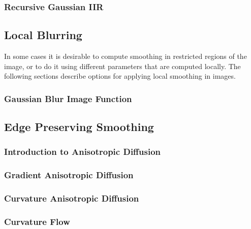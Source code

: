 \subsubsection{Recursive Gaussian IIR}
\label{sec:RecursiveGaussianImageFilter}



\subsection{Local Blurring}
\label{sec:BlurringFunctions}

In some cases it is desirable to compute smoothing in restricted regions of the
image, or to do it using different parameters that are computed locally.  The
following sections describe options for applying local smoothing in images.

\subsubsection{Gaussian Blur Image Function}
\label{sec:GaussianBlurImageFunction}



\subsection{Edge Preserving Smoothing}
\label{sec:EdgePreservingSmoothingFilters}

\subsubsection{Introduction to Anisotropic Diffusion}
\label{sec:IntroductionAnisotropicDiffusion}



\subsubsection{Gradient Anisotropic Diffusion}
\label{sec:GradientAnisotropicDiffusionImageFilter}



\subsubsection{Curvature Anisotropic Diffusion}
\label{sec:CurvatureAnisotropicDiffusionImageFilter}



\subsubsection{Curvature Flow}
\label{sec:CurvatureFlowImageFilter}



